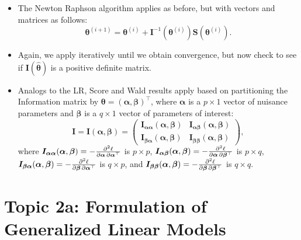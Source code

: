 \documentclass[final]{article}\usepackage[]{graphicx}\usepackage[svgnames]{xcolor}
\providecommand{\Vector}[1]{\bm{#1}}%
\providecommand{\Matrix}[1]{\bm{#1}}
\begin{document}
\begin{itemize}
      \item The Newton Raphson algorithm applies as before, but with vectors and matrices
            as follows:
            \[ \Vector{\theta}^{(i+1)}=\Vector{\theta}^{(i)}+\Matrix{I}^{-1}(\Vector{\theta}^{(i)})\Vector{S}(\Vector{\theta}^{(i)}). \]
      \item Again, we apply iteratively until we obtain convergence, but now check to
            see if $ \Matrix{I}(\hat{\Vector{\theta}}) $ is a positive definite matrix.
      \item Analogs to the LR, Score and Wald results apply based on partitioning the
            Information matrix by $ \Vector{\theta}=(\Vector{\alpha},\Vector{\beta})^\top $,
            where $ \Vector{\alpha} $ is a $ p\times 1 $ vector of nuisance parameters and $ \Vector{\beta} $ is a $ q\times 1 $ vector of parameters of interest:
            \[ \Matrix{I}=\Matrix{I}(\Vector{\alpha},\Vector{\beta})=\begin{pmatrix}
                        \Matrix{I}_{\Vector{\alpha}\Vector{\alpha}}(\Vector{\alpha},\Vector{\beta}) & \Matrix{I}_{\Vector{\alpha}\Vector{\beta}}(\Vector{\alpha},\Vector{\beta}) \\
                        \Matrix{I}_{\Vector{\beta}\Vector{\alpha}}(\Vector{\alpha},\Vector{\beta})  & \Matrix{I}_{\Vector{\beta}\Vector{\beta}}(\Vector{\alpha},\Vector{\beta})
                  \end{pmatrix}, \]
            where
            $ \Matrix{I}_{\Vector{\alpha}\Vector{\alpha}}(\Vector{\alpha},\Vector{\beta})=-\pdv{\ell}{\Vector{\alpha},\Vector{\alpha}^\top} $ is $ p\times p $,
            $ \Matrix{I}_{\Vector{\alpha}\Vector{\beta}}(\Vector{\alpha},\Vector{\beta})=-\pdv{\ell}{\Vector{\alpha},\Vector{\beta}^\top} $ is $ p\times q $,
            $ \Matrix{I}_{\Vector{\beta}\Vector{\alpha}}(\Vector{\alpha},\Vector{\beta})=-\pdv{\ell}{\Vector{\beta},\Vector{\alpha}^\top} $ is $ q\times p $, and
            $ \Matrix{I}_{\Vector{\beta}\Vector{\beta}}(\Vector{\alpha},\Vector{\beta})=-\pdv{\ell}{\Vector{\beta},\Vector{\beta}^\top} $ is $ q\times q $.
\end{itemize}

\section*{Topic 2a: Formulation of Generalized Linear Models}
\end{document}
